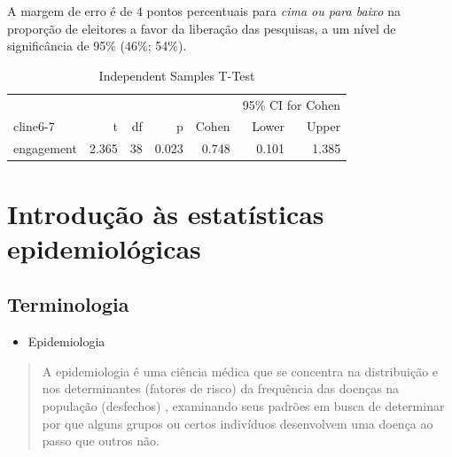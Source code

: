 \documentclass[
]{book}
\providecommand{\tightlist}{%
  \setlength{\itemsep}{0pt}\setlength{\parskip}{0pt}}
\begin{document}
\hfill\break

A margem de erro é de 4 pontos percentuais para \emph{cima ou para baixo} na proporção de eleitores a favor da liberação das pesquisas, a um nível de significância de 95\% (46\%; 54\%).

\begin{table}[h]
\centering
\caption{Independent Samples T-Test}
\label{tab:independentSamplesT-Test}
{
\begin{tabular}{lrrrrrr}
\toprule
\multicolumn{1}{c}{} & \multicolumn{1}{c}{} & \multicolumn{1}{c}{} & \multicolumn{1}{c}{} & \multicolumn{1}{c}{} & \multicolumn{2}{c}{95\% CI for Cohen} \\
cline{6-7}
& t & df & p & Cohen & Lower & Upper  \\
\cmidrule[0.4pt]{1-7}
engagement & 2.365 & 38 & 0.023 & 0.748 & 0.101 & 1.385  \\
\bottomrule
\end{tabular}
}
\end{table}

\hypertarget{introduuxe7uxe3o-uxe0s-estatuxedsticas-epidemioluxf3gicas}{%
\chapter{Introdução às estatísticas epidemiológicas}\label{introduuxe7uxe3o-uxe0s-estatuxedsticas-epidemioluxf3gicas}}

\hfill\break

\hypertarget{terminologia}{%
\section{Terminologia}\label{terminologia}}

\hfill\break

\begin{itemize}
\tightlist
\item
  Epidemiologia
\end{itemize}

\hfill\break

\begin{quote}
A epidemiologia é uma ciência médica que se concentra na distribuição e nos determinantes (fatores de risco) da frequência das doenças na população (desfechos) , examinando seus padrões em busca de determinar por que alguns grupos ou certos indivíduos desenvolvem uma doença ao passo que outros não.
\end{quote}
\end{document}
